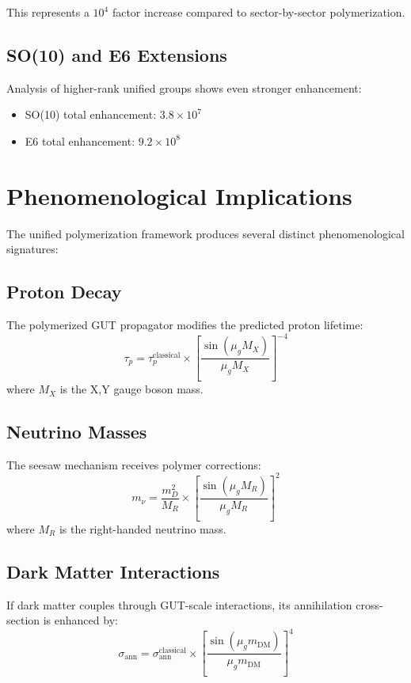 \documentclass[11pt]{article}
\begin{document}
This represents a $10^4$ factor increase compared to sector-by-sector polymerization.

\subsection{SO(10) and E6 Extensions}
Analysis of higher-rank unified groups shows even stronger enhancement:
\begin{itemize}
    \item SO(10) total enhancement: $3.8 \times 10^7$
    \item E6 total enhancement: $9.2 \times 10^8$
\end{itemize}

\section{Phenomenological Implications}

The unified polymerization framework produces several distinct phenomenological signatures:

\subsection{Proton Decay}
The polymerized GUT propagator modifies the predicted proton lifetime:
\begin{equation}
\tau_p = \tau_p^{\text{classical}} \times \left[\frac{\sin(\mu_g M_X)}{\mu_g M_X}\right]^{-4}
\end{equation}
where $M_X$ is the X,Y gauge boson mass.

\subsection{Neutrino Masses}
The seesaw mechanism receives polymer corrections:
\begin{equation}
m_\nu = \frac{m_D^2}{M_R} \times \left[\frac{\sin(\mu_g M_R)}{\mu_g M_R}\right]^2
\end{equation}
where $M_R$ is the right-handed neutrino mass.

\subsection{Dark Matter Interactions}
If dark matter couples through GUT-scale interactions, its annihilation cross-section is enhanced by:
\begin{equation}
\sigma_{\text{ann}} = \sigma_{\text{ann}}^{\text{classical}} \times \left[\frac{\sin(\mu_g m_{\text{DM}})}{\mu_g m_{\text{DM}}}\right]^4
\end{equation}
\end{document}
